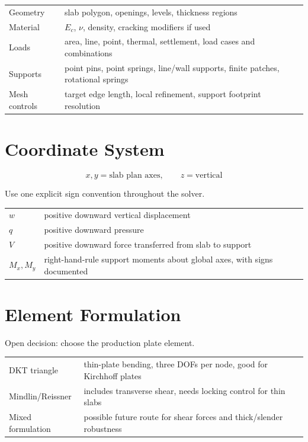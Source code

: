 \documentclass[10pt]{article}
\begin{document}
{\ttfamily\footnotesize
\begin{tabular}{@{}p{1.7in}p{4.8in}@{}}
Geometry & slab polygon, openings, levels, thickness regions \\
Material & $E_c$, $\nu$, density, cracking modifiers if used \\
Loads & area, line, point, thermal, settlement, load cases and combinations \\
Supports & point pins, point springs, line/wall supports, finite patches, rotational springs \\
Mesh controls & target edge length, local refinement, support footprint resolution \\
\end{tabular}
}

\section{Coordinate System}

\begin{equation}
x,y = \text{slab plan axes}, \qquad z = \text{vertical}
\end{equation}

Use one explicit sign convention throughout the solver.


{\ttfamily\footnotesize
\begin{tabular}{@{}p{1.7in}p{4.8in}@{}}
$w$ & positive downward vertical displacement \\
$q$ & positive downward pressure \\
$V$ & positive downward force transferred from slab to support \\
$M_x,M_y$ & right-hand-rule support moments about global axes, with signs documented \\
\end{tabular}
}

\section{Element Formulation}

Open decision: choose the production plate element.


{\ttfamily\footnotesize
\begin{tabular}{@{}p{1.7in}p{4.8in}@{}}
DKT triangle & thin-plate bending, three DOFs per node, good for Kirchhoff plates \\
Mindlin/Reissner & includes transverse shear, needs locking control for thin slabs \\
Mixed formulation & possible future route for shear forces and thick/slender robustness \\
\end{tabular}
}
\end{document}
